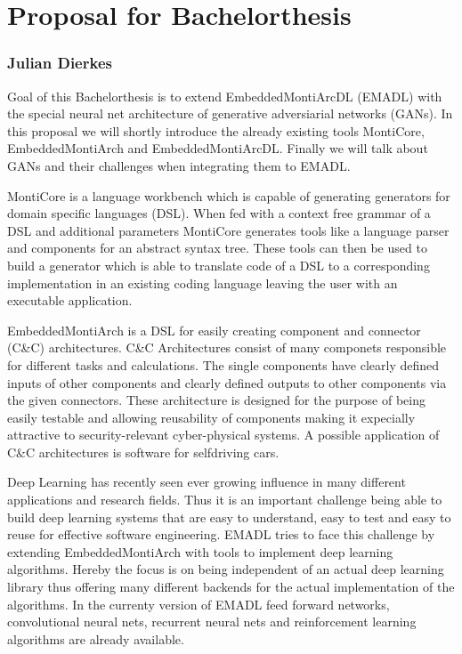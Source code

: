 \documentclass[12pt, a4paper]{article}
\begin{document}
\pagestyle{empty}

\section*{Proposal for Bachelorthesis}
\subsubsection*{Julian Dierkes}

Goal of this Bachelorthesis is to extend EmbeddedMontiArcDL (EMADL) with the special neural net
architecture of generative adversiarial networks (GANs). In this proposal we will shortly introduce
the already existing tools MontiCore, EmbeddedMontiArch and EmbeddedMontiArcDL. Finally we will
talk about GANs and their challenges when integrating them to EMADL.

\bigskip

MontiCore is a language workbench which is capable of generating generators for domain specific
languages (DSL). When fed with a context free grammar of a DSL and additional parameters MontiCore 
generates tools like a language parser and components for an abstract syntax tree. These tools
can then be used to build a generator which is able to translate code of a DSL to a corresponding
implementation in an existing coding language leaving the user with an executable application.

\bigskip

EmbeddedMontiArch is a DSL for easily creating component and connector (C\&C) architectures.
C\&C Architectures consist of many componets responsible for different tasks and calculations. The
single components have clearly defined inputs of other components and clearly defined outputs to
other components via the given connectors. These architecture is designed for the purpose of being
easily testable and allowing reusability of components making it
expecially attractive to security-relevant cyber-physical systems. A possible application of C\&C
architectures is software for selfdriving cars.

\bigskip

Deep Learning has recently seen ever growing influence in many different applications and research
fields. Thus it is an important challenge being able to build deep learning systems that are easy to understand, 
easy to test and easy to reuse for effective software engineering. EMADL tries to face this challenge by extending
EmbeddedMontiArch with tools to implement deep learning algorithms. Hereby the focus is on being
independent of an actual deep learning library thus offering many different backends for the actual
implementation of the algorithms. In the currenty version of EMADL feed forward networks,
convolutional neural nets, recurrent neural nets and reinforcement learning algorithms are already
available.
\end{document}
